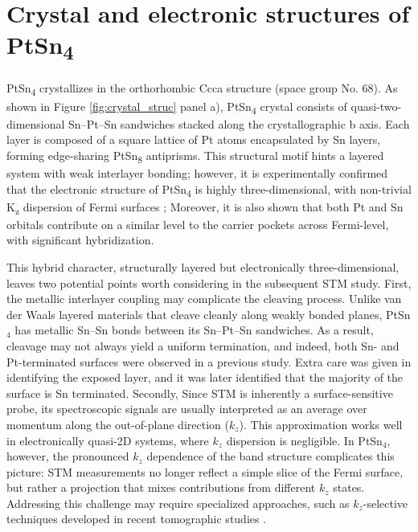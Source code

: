 \section{Crystal and electronic structures of PtSn\textsubscript{4}}

PtSn\textsubscript{4} crystallizes in the orthorhombic Ccca structure (space group No. 68). As shown in Figure \ref{fig:crystal_struc} panel a), PtSn\textsubscript{4} crystal consists of quasi-two-dimensional Sn–Pt–Sn sandwiches stacked along the crystallographic b axis. Each layer is composed of a square lattice of Pt atoms encapsulated by Sn layers, forming edge-sharing PtSn\textsubscript{8} antiprisms. This structural motif hints a layered system with weak interlayer bonding; however, it is experimentally confirmed that the electronic structure of PtSn\textsubscript{4} is highly three-dimensional, with non-trivial K\textsubscript{z} dispersion of Fermi surfaces  \cite{wuDiracNodeArcs2016,linUltrafastCarrierRelaxation2024,inamdarQuantumOscillationsUltra2013a,munMagneticFieldEffects2012,yaraSmallFermiSurfaces2018a,diazSemiclassicalOriginExtreme2024}; Moreover, it is also shown that both Pt and Sn orbitals contribute on a similar level to the carrier pockets across Fermi-level, with significant hybridization\cite{luoOriginExtremelyLarge2018}. 

This hybrid character, structurally layered but electronically three-dimensional, leaves two potential points worth considering in the subsequent \ac{STM} study. First, the metallic interlayer coupling may complicate the cleaving process. Unlike van der Waals layered materials that cleave cleanly along weakly bonded planes, PtSn$_4$ has metallic Sn–Sn bonds between its Sn–Pt–Sn sandwiches. As a result, cleavage may not always yield a uniform termination, and indeed, both Sn- and Pt-terminated surfaces were observed in a previous study\cite{liDiracNodalArc2019}. Extra care was given in identifying the exposed layer, and it was later identified that the majority of the surface is Sn terminated. Secondly, Since \ac{STM} is inherently a surface-sensitive probe, its spectroscopic signals are usually interpreted as an average over momentum along the out-of-plane direction ($k_z$). This approximation works well in electronically quasi-2D systems, where $k_z$ dispersion is negligible. In PtSn$_4$, however, the pronounced $k_z$ dependence of the band structure complicates this picture: STM measurements no longer reflect a simple slice of the Fermi surface, but rather a projection that mixes contributions from different $k_z$ states. Addressing this challenge may require specialized approaches, such as $k_z$-selective techniques developed in recent tomographic studies \cite{marquesTomographicMappingHidden2021}.


